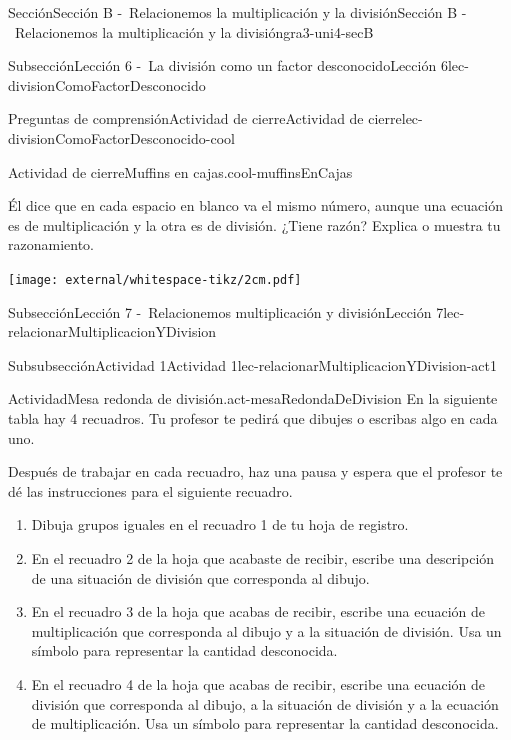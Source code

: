 \begin{sectionptx}{Sección}{Sección B -~Relacionemos la multiplicación y la división}{}{Sección B -~Relacionemos la multiplicación y la división}{}{}{gra3-uni4-secB}
\begin{subsectionptx}{Subsección}{Lección 6 -~La división como un factor desconocido}{}{Lección 6}{}{}{lec-divisionComoFactorDesconocido}
\begin{reading-questions-subsubsection}{Preguntas de comprensión}{Actividad de cierre}{}{Actividad de cierre}{}{}{lec-divisionComoFactorDesconocido-cool}
\begin{project}{Actividad de cierre}{Muffins en cajas.}{cool-muffinsEnCajas}
\par
Él dice que en cada espacio en blanco va el mismo número, aunque una ecuación es de multiplicación y la otra es de división. ¿Tiene razón? Explica o muestra tu razonamiento.%
\begin{image}{0}{1}{0}{}%
\texttt{[image: external/whitespace-tikz/2cm.pdf]}
\end{image}%
\end{project}%
\end{reading-questions-subsubsection}
\end{subsectionptx}
%
%
\typeout{************************************************}
\typeout{************************************************}
%
\begin{subsectionptx}{Subsección}{Lección 7 -~Relacionemos multiplicación y división}{}{Lección 7}{}{}{lec-relacionarMultiplicacionYDivision}
%
%
\typeout{************************************************}
\typeout{************************************************}
%
\begin{subsubsectionptx}{Subsubsección}{Actividad 1}{}{Actividad 1}{}{}{lec-relacionarMultiplicacionYDivision-act1}
\begin{activity}{Actividad}{Mesa redonda de división.}{act-mesaRedondaDeDivision}%
En la siguiente tabla hay 4 recuadros. Tu profesor te pedirá que dibujes o escribas algo en cada uno.%
\par
Después de trabajar en cada recuadro, haz una pausa y espera que el profesor te dé las instrucciones para el siguiente recuadro.%
%
\begin{enumerate}
\item{}Dibuja grupos iguales en el recuadro 1 de tu hoja de registro.%
\item{}En el recuadro 2 de la hoja que acabaste de recibir, escribe una descripción de una situación de división que corresponda al dibujo.%
\item{}En el recuadro 3 de la hoja que acabas de recibir, escribe una ecuación de multiplicación que corresponda al dibujo y a la situación de división. Usa un símbolo para representar la cantidad desconocida.%
\item{}En el recuadro 4 de la hoja que acabas de recibir, escribe una ecuación de división que corresponda al dibujo, a la situación de división y a la ecuación de multiplicación. Usa un símbolo para representar la cantidad desconocida.%
\end{enumerate}

\end{activity}
\end{subsubsectionptx}
\end{subsectionptx}
\end{sectionptx}
